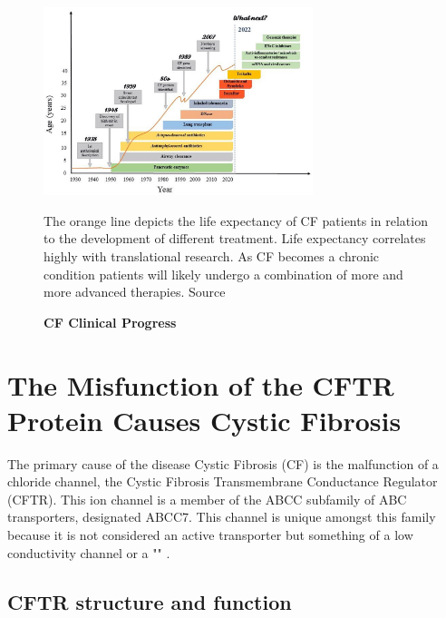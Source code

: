 \begin{figure}
	\label{CF_life_expectancy}
	\begin{center}
	\includegraphics[width=0.7\textwidth]{figures/CF_life_expectancy.png}
	\end{center}
	\captionsetup{singlelinecheck = false, justification=raggedright}
	\caption[CF Clinical Progress] {\textbf{CF Clinical Progress}}{The orange line depicts the life expectancy of CF patients in relation to the development of different treatment.  Life expectancy correlates highly with translational research. As CF becomes a chronic condition patients will likely undergo a combination of more and more advanced therapies. Source \cite{garcia2022}} 
\end{figure}


\section{The Misfunction of the CFTR Protein Causes Cystic Fibrosis}

The primary cause of the disease Cystic Fibrosis (CF) is the malfunction of a chloride channel, the Cystic Fibrosis Transmembrane Conductance Regulator (CFTR). This ion channel is a member of the ABCC subfamily of ABC transporters, designated ABCC7. This channel is unique amongst this family because it is not considered an active transporter but something of a low conductivity channel or a "" \cite{linsdell2018}.

\subsection{CFTR structure and function}


